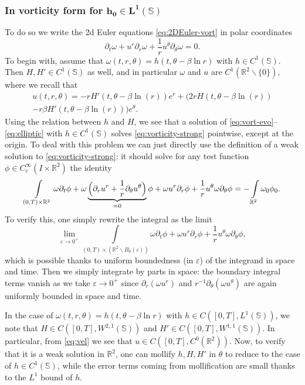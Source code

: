 \documentclass[JEP,XML,SOM,Unicode,NoFloatCountersInSection,published]{cedram}
\let\oldthesubsubsection\thesubsubsection
\renewcommand{\thesubsubsection}{\arabic{subsubsection}}
\let\epsilon\varepsilon
\theoremstyle{plain}
\theoremstyle{definition}
\let\rd\partial
\let\eps\epsilon
\let\tht\theta
\let\omg\omega
\newcommand{\bbR}{\mathbb R}
\newcommand{\bbS}{\mathbb S}
\begin{document}
\let\thesubsubsection\oldthesubsubsection
\subsubsection{In vorticity form for $\boldsymbol{h_0\in L^1\left(\mathbb{S}\right)}$}
To do so we write the 2d Euler equations \eqref{eq:2DEuler-vort} in polar coordinates
\begin{equation}\label{eq:vorticity-strong}
\partial_t \omega+u^r\partial_r \omega+\frac{1}{r}u^\theta \partial_\theta \omega=0.
\end{equation}
To begin with, assume that $\omg(t,r,\theta)=h(t,\theta-\beta\ln r)$ with $h \in C^{1}(\bbS)$. Then $H, H' \in C^{1}(\bbS)$ as well, and in particular $\omg$ and $u$ are $C^{1}(\bbR^{2}\backslash\{0\})$, where we recall that
\begin{multline}\label{eq:vel}
u(t,r,\theta)= -r H'(t,\theta -\beta \ln (r)) e^{r} + (
2r H(t,\theta -\beta \ln (r))\\
-r\beta H'(t,\theta -\beta \ln (r))) e^{\tht}.
\end{multline}
Using the relation between $h$ and $H$, we see that a solution of \eqref{eq:vort-evo}--\eqref{eq:elliptic} with $h \in C^{1}(\bbS)$ solves \eqref{eq:vorticity-strong} pointwise, except at the origin. To deal with this problem we can just directly use the definition of a weak solution to \eqref{eq:vorticity-strong}: it should solve for any test function $\phi\in C^{\infty}_c\left(I\times \mathbb{R}^2\right)$ the identity
\[
\int\limits_{(0,T)\times\mathbb{R}^2}\omega \partial_t\phi+\omega\underbrace{\Bigl(\partial_r u^r+\frac{1}{r}\partial_\theta u^\theta\Bigr)}_{=0}\phi+\omega u^r\partial_r \phi+\frac{1}{r}u^\theta\omega \partial_\theta \phi=-\int\limits_{\mathbb{R}^2}\omega_0\phi_0.
\]
To verify this, one simply rewrite the integral as the limit
\[
\lim_{\eps\to 0^+} \int\limits_{(0,T)\times(\mathbb{R}^2 \backslash B_{0}(\eps)) }\omega \partial_t\phi+\omega u^r\partial_r \phi+\frac{1}{r}u^\theta\omega \partial_\theta \phi,
\]
which is possible thanks to uniform boundedness (in $\eps$) of the integrand in space and time. Then we simply integrate by parts in space: the boundary integral terms vanish as we take $\eps\to 0^+$ since $\rd_r(\omg u^r)$ and $r^{-1}\rd_\tht(\omg u^\tht)$ are again uniformly bounded in space and time.

In the case of $\omg(t,r,\theta)=h(t,\theta-\beta\ln r)$ with $h \in C\left([0,T], L^{1}(\bbS)\right)$, we note that $H \in C\left([0,T], W^{2,1}(\bbS)\right)$ and $H' \in C\left([0,T], W^{1,1}(\bbS)\right)$. In particular, from \eqref{eq:vel} we see that $u\in C\left([0,T], C^0(\mathbb{R}^2)\right)$. Now, to verify that it is a weak solution in $\bbR^{2}$, one can mollify $h, H, H'$ in $\theta$ to reduce to the case of $h \in C^1(\bbS)$, while the error terms coming from mollification are small thanks to the $L^1$ bound of $h$.
\end{document}
